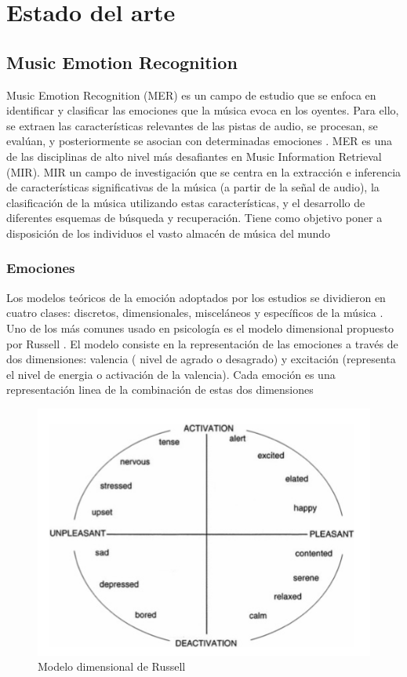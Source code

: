 \documentclass[12pt,a4paper,Spanish]{article}
\begin{document}
\newpage
\section{Estado del arte}
\subsection{Music Emotion Recognition}

Music Emotion Recognition (MER) es un campo de estudio que se enfoca en identificar y clasificar las emociones que la música evoca en los oyentes. Para ello, se extraen las características relevantes de las pistas de audio, se procesan, se evalúan, y posteriormente se asocian con determinadas emociones \cite{GomezCanon2021SPM}.
\newline
MER es una de las disciplinas de alto nivel más desafiantes en Music Information Retrieval (MIR). MIR un campo de investigación que se centra en la extracción e inferencia de características significativas de la música (a partir de la señal de audio), la clasificación de la música utilizando estas características, y el desarrollo de diferentes esquemas de búsqueda y recuperación. Tiene como objetivo poner a disposición de los individuos el vasto almacén de música del mundo \cite{schedl2014music}

\subsubsection{Emociones}\label{emo}

Los modelos teóricos de la emoción adoptados por los estudios se dividieron en cuatro clases: discretos, dimensionales, misceláneos y específicos de la música \cite{eerola2012review}. 
\newline
Uno de los más comunes usado en psicología es el modelo dimensional propuesto por Russell \cite{posner2005circumplex}. El modelo consiste en la representación de las emociones a través de dos dimensiones: valencia ( nivel de agrado o desagrado) y excitación (representa el nivel de energia o activación de la valencia). Cada emoción es una representación linea de la combinación de estas dos dimensiones

\begin{figure}[H]
	\centering
	\includegraphics[width=0.7\linewidth]{figs/russell}
	\caption{Modelo dimensional de Russell}
	\label{fig:russell}
\end{figure}
\end{document}
